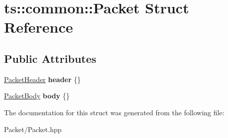 \hypertarget{structts_1_1common_1_1_packet}{}\section{ts\+:\+:common\+:\+:Packet Struct Reference}
\label{structts_1_1common_1_1_packet}
\subsection*{Public Attributes}
\begin{DoxyCompactItemize}
\item 
\mbox{\label{structts_1_1common_1_1_packet_a22cf5cbe00488c2f324bc580b43b332b}} 
\hyperlink{structts_1_1common_1_1_packet_header}{Packet\+Header} {\bfseries header} \{\}
\item 
\mbox{\label{structts_1_1common_1_1_packet_ae1df6eb6a4d7307e68369a144a0c6a51}} 
\hyperlink{structts_1_1common_1_1_packet_body}{Packet\+Body} {\bfseries body} \{\}
\end{DoxyCompactItemize}


The documentation for this struct was generated from the following file\+:\begin{DoxyCompactItemize}
\item 
Packet/Packet.\+hpp\end{DoxyCompactItemize}
